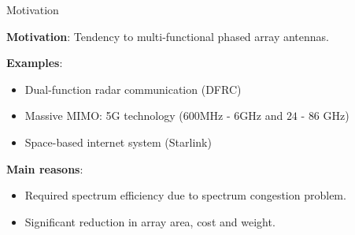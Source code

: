 \documentclass[../main.tex]{subfiles}
\begin{document}
%
%


\begin{frame}[t]{Motivation}

\textbf{Motivation}: Tendency to multi-functional phased array antennas.

\textbf{Examples}:

\begin{itemize}
    \item Dual-function radar communication (DFRC)
    \item Massive MIMO: 5G technology ($600$MHz - $6$GHz and $24$ - $86$ GHz)
    \item Space-based internet system (Starlink)
\end{itemize}

\textbf{Main reasons}: 
\begin{itemize}
    \item Required spectrum efficiency due to spectrum congestion problem.
    \item Significant reduction in array area, cost and weight.
\end{itemize}


\end{frame}



%
%
\end{document}
